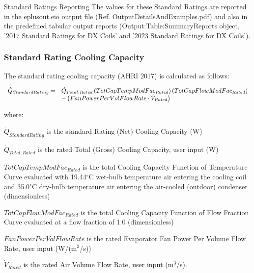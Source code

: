 Standard Ratings Reporting
The values for these Standard Ratings are reported in the eplusout.eio output file (Ref. OutputDetailsAndExamples.pdf) and also in the predefined tabular output reports (Output:Table:SummaryReports object, '2017 Standard Ratings for DX Coils' and '2023 Standard Ratings for DX Coils').

\subsubsection{Standard Rating Cooling Capacity}

The standard rating cooling capacity (AHRI 2017) is calculated as follows:

\begin{equation}
\begin{array}{rl}
\dot{Q}_{StandardRating} =& \dot{Q}_{Total,Rated}\left(TotCapTempModFac_{Rated}\right)\left(TotCapFlowModFac_{Rated}\right) \\
 & - \left(FanPowerPerVolFlowRate \cdot \dot{V}_{Rated}\right)
\end{array}
\end{equation}

where:

\({\dot Q_{StandardRating}}\) is the standard Rating (Net) Cooling Capacity (W)

\({\dot Q_{Total,Rated}}\) is the rated Total (Gross) Cooling Capacity, user input (W)

\(TotCapTempModFa{c_{Rated}}\) is the total Cooling Capacity Function of Temperature Curve evaluated with 19.44\(^{\circ}\)C wet-bulb temperature air entering the cooling coil and 35.0\(^{\circ}\)C dry-bulb temperature air entering the air-cooled (outdoor) condenser (dimensionless)

\(TotCapFlowModFa{c_{Rated}}\) is the total Cooling Capacity Function of Flow Fraction Curve evaluated at a flow fraction of 1.0 (dimensionless)

\(FanPowerPerVolFlowRate\) is the rated Evaporator Fan Power Per Volume Flow Rate, user input (W/(m\(^{3}\)/s))

\({\dot V_{Rated}}\) is the rated Air Volume Flow Rate, user input (m\(^{3}\)/s).

